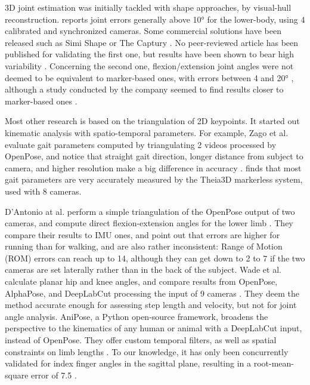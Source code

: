 3D joint estimation was initially tackled with shape approaches, by visual-hull reconstruction. \cite{Ceseracciu2014} reports joint errors generally above 10° for the lower-body, using 4 calibrated and synchronized cameras. Some commercial solutions have been released such as Simi Shape \cite{SimiShape} or The Captury \cite{Captury}. No peer-reviewed article has been published for validating the first one, but results have been shown to bear high variability \cite{Becker2015}. Concerning the second one, flexion/extension joint angles were not deemed to be equivalent to marker-based ones, with errors between 4 and 20° \cite{Harsted2019}, although a study conducted by the company seemed to find results closer to marker-based ones \cite{Fleisig2022}. 

Most other research is based on the triangulation of 2D keypoints. It started out kinematic analysis with spatio-temporal parameters. For example, Zago et al. evaluate gait parameters computed by triangulating 2 videos processed by OpenPose, and notice that straight gait direction, longer distance from subject to camera, and higher resolution make a big difference in accuracy \cite{Zago2020}. \cite{Kanko2021c} finds that most gait parameters are very accurately measured by the Theia3D markerless system, used with 8 cameras.

D’Antonio at al. perform a simple triangulation of the OpenPose output of two cameras, and compute direct flexion-extension angles for the lower limb \cite{D'Antonio2021}. They compare their results to IMU ones, and point out that errors are higher for running than for walking, and are also rather inconsistent: Range of Motion (ROM) errors can reach up to 14\degree{}, although they can get down to 2 to 7\degree{} if the two cameras are set laterally rather than in the back of the subject. Wade et al. calculate planar hip and knee angles, and compare results from OpenPose, AlphaPose, and DeepLabCut processing the input of 9 cameras \cite{Wade2021}. They deem the method accurate enough for assessing step length and velocity, but not for joint angle analysis. AniPose, a Python open-source framework, broadens the perspective to the kinematics of any human or animal with a DeepLabCut input, instead of OpenPose. They offer custom temporal filters, as well as spatial constraints on limb lengths \cite{Karashchuk2021}. To our knowledge, it has only been concurrently validated for index finger angles in the sagittal plane, resulting in a root-mean-square error of 7.5\degree{} \cite{Geelen2021}.

